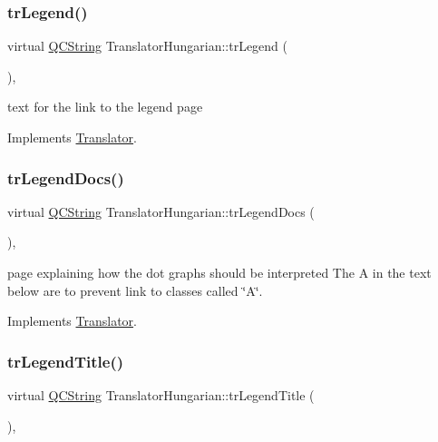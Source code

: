 \subsubsection{\texorpdfstring{trLegend()}{trLegend()}}
{\footnotesize\ttfamily virtual \mbox{\hyperlink{class_q_c_string}{Q\+C\+String}} Translator\+Hungarian\+::tr\+Legend (\begin{DoxyParamCaption}{ }\end{DoxyParamCaption})\hspace{0.3cm}{\ttfamily [inline]}, {\ttfamily [virtual]}}

text for the link to the legend page 

Implements \mbox{\hyperlink{class_translator}{Translator}}.

\mbox{\label{class_translator_hungarian_aa07bb8616bc91728d3d091c58c0334af}} 
\subsubsection{\texorpdfstring{trLegendDocs()}{trLegendDocs()}}
{\footnotesize\ttfamily virtual \mbox{\hyperlink{class_q_c_string}{Q\+C\+String}} Translator\+Hungarian\+::tr\+Legend\+Docs (\begin{DoxyParamCaption}{ }\end{DoxyParamCaption})\hspace{0.3cm}{\ttfamily [inline]}, {\ttfamily [virtual]}}

page explaining how the dot graph\textquotesingle{}s should be interpreted The A in the text below are to prevent link to classes called \char`\"{}\+A\char`\"{}. 

Implements \mbox{\hyperlink{class_translator}{Translator}}.

\mbox{\label{class_translator_hungarian_a9efd6ed65457baf0a960404036fa18c1}} 
\subsubsection{\texorpdfstring{trLegendTitle()}{trLegendTitle()}}
{\footnotesize\ttfamily virtual \mbox{\hyperlink{class_q_c_string}{Q\+C\+String}} Translator\+Hungarian\+::tr\+Legend\+Title (\begin{DoxyParamCaption}{ }\end{DoxyParamCaption})\hspace{0.3cm}{\ttfamily [inline]}, {\ttfamily [virtual]}}


